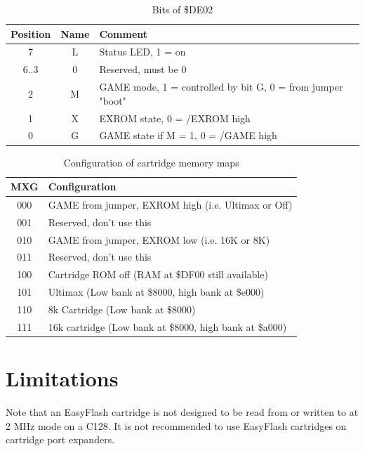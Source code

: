 \documentclass[a4paper,oneside]{memoir}
\begin{document}
\begin{table}[!htbp]
    \centering
    \begin{tabularx}{\textwidth}{ ccX }
        \toprule
        Position & Name & Comment \\
        \midrule
        7       & L & Status LED, 1 = on                    \\[3pt]
        6..3    & 0 & Reserved, must be 0                   \\[3pt]
        2       & M & GAME mode, 1 = controlled by bit G, 0 = from jumper "boot" \\[3pt]
        1       & X & EXROM state, 0 = /EXROM high          \\[3pt]
        0       & G & GAME state if M = 1, 0 = /GAME high   \\[3pt]
        \bottomrule
    \end{tabularx}
    \caption{Bits of \$DE02}
    \label{tab:ef-control-details}
\end{table}

\begin{table}[!htbp]
    \centering
    \begin{tabularx}{\textwidth}{ cX }
        \toprule
        MXG & Configuration \\
        \midrule
        000 & GAME from jumper, EXROM high (i.e. Ultimax or Off)    \\[3pt]
        001 & Reserved, don't use this                              \\[3pt]
        010 & GAME from jumper, EXROM low  (i.e. 16K or 8K)         \\[3pt]
        011 & Reserved, don't use this                              \\[3pt]
        100 & Cartridge ROM off (RAM at \$DF00 still available)     \\[3pt]
        101 & Ultimax (Low bank at \$8000, high bank at \$e000)     \\[3pt]
        110 & 8k Cartridge (Low bank at \$8000) \\[3pt]
        111 & 16k cartridge (Low bank at \$8000, high bank at \$a000) \\[3pt]
        \bottomrule
    \end{tabularx}
    \caption{Configuration of cartridge memory maps}
    \label{tab:mem-maps}
\end{table}

\section{Limitations}
Note that an EasyFlash cartridge is not designed to be read from or written to at 2 MHz mode on a C128. It is not recommended to use EasyFlash cartridges on cartridge port expanders.
\end{document}
